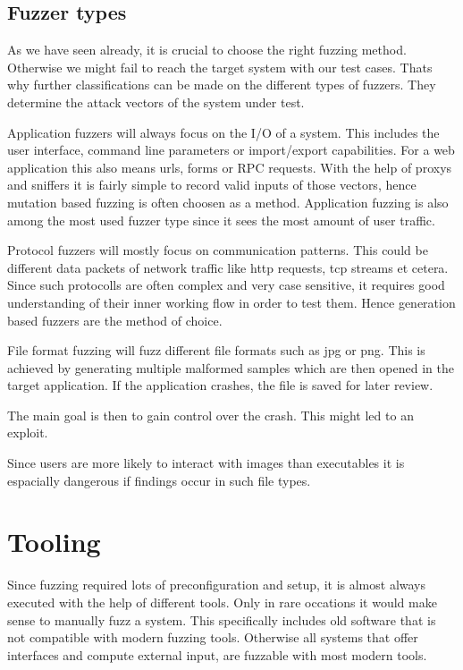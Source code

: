 \documentclass[journal=tosc,final]{iacrtrans}
\begin{document}
\subsection{Fuzzer types}
As we have seen already, it is crucial to choose the right fuzzing method. Otherwise we might fail to reach the target system with our test cases. Thats why further classifications can be made on the different types of fuzzers. They determine the attack vectors of the system under test. 

Application fuzzers will always focus on the I/O of a system. This includes the user interface, command line parameters or import/export capabilities. For a web application this also means urls, forms or RPC requests. With the help of proxys and sniffers it is fairly simple to record valid inputs of those vectors, hence mutation based fuzzing is often choosen as a method. Application fuzzing  is also among the most used fuzzer type since it sees the most amount of user traffic.

Protocol fuzzers will mostly focus on communication patterns. This could be different data packets of network traffic like http requests, tcp streams et cetera. Since such protocolls are often complex and very case sensitive, it requires good understanding of their inner working flow in order to test them. Hence generation based fuzzers are the method of choice.

File format fuzzing will fuzz different file formats such as jpg or png. This is achieved by generating multiple malformed samples which are then opened in the target application. 
If the application crashes, the file is saved for later review. 

The main goal is then to gain control over the crash. This might led to an exploit.

Since users are more likely to interact with images than executables it is espacially dangerous if findings occur in such file types.
\section{Tooling}
Since fuzzing required lots of preconfiguration and setup, it is almost always executed with the help of different tools. Only in rare occations it would make sense to manually fuzz a system. This specifically includes old software that is not compatible with modern fuzzing tools. Otherwise all systems that offer interfaces and compute external input, are fuzzable with most modern tools. 
\end{document}
